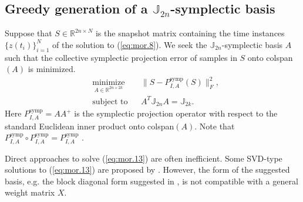 \subsection{Greedy generation of a $\mathbb J_{2n}$-symplectic basis} \label{sec:mor.3}
Suppose that $S \in \mathbb R^{2n\times N}$ is the snapshot matrix containing the time instances $\{z(t_i)\}_{i=1}^N$ of the solution to (\ref{eq:mor.8}). We seek the $\mathbb J_{2n}$-symplectic basis $A$ such that the collective symplectic projection error of samples in $S$ onto colspan$(A)$ is minimized.
\begin{equation} \label{eq:mor.13}
\begin{aligned}
& \underset{A\in \mathbb{R}^{2n\times 2k}}{\text{minimize}}
& & \| S - P^\text{symp}_{I,A}(S) \|_F^2, \\
& \text{subject to}
& & A^T\mathbb J_{2n}A = \mathbb J_{2k}.
\end{aligned}
\end{equation}
Here $P^\text{symp}_{I,A} = AA^+$ is the symplectic projection operator with respect to the standard Euclidean inner product onto colspan$(A)$. Note that $P^\text{symp}_{I,A} \circ P^\text{symp}_{I,A} = P^\text{symp}_{I,A}$ \cite{doi:10.1137/140978922,doi:10.1137/17M1111991}.

Direct approaches to solve (\ref{eq:mor.13}) are often inefficient. Some SVD-type solutions to (\ref{eq:mor.13}) are proposed by \cite{doi:10.1137/140978922}. However, the form of the suggested basis, e.g. the block diagonal form suggested in \cite{doi:10.1137/140978922}, is not compatible with a general weight matrix $X$. 

